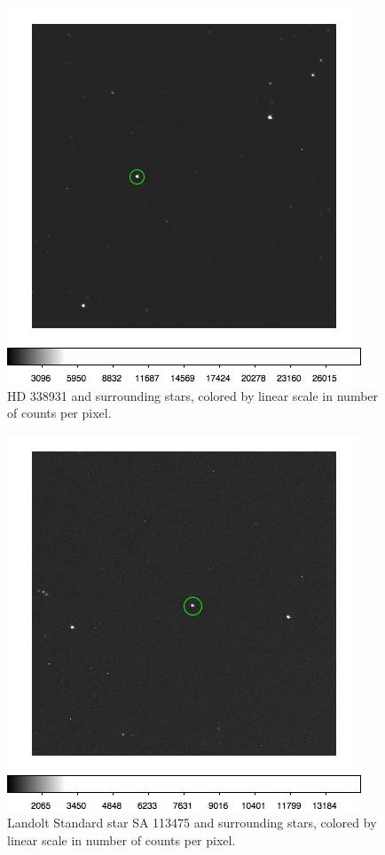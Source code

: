 \documentclass{article}
\begin{document}
\begin{figure}[h]
\centering
\includegraphics[scale=.75]{hd3.jpg}
\caption{\label{fig:hd3} HD 338931 and surrounding stars, colored by linear scale in number of counts per pixel.}
\end{figure}

\begin{figure}[h]
\centering
\includegraphics[scale=.75]{sa1.jpg}
\caption{\label{fig:sa} Landolt Standard star SA 113475 and surrounding stars, colored by linear scale in number of counts per pixel.}
\end{figure}
\end{document}
